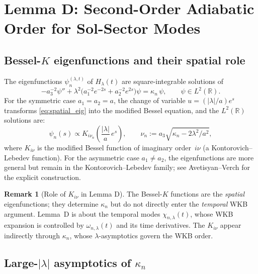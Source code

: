\documentclass[11pt,a4paper]{article}
\theoremstyle{definition}
\newtheorem{remark}[theorem]{Remark}
\newcommand{\R}{\mathbb{R}}
\newcommand{\Lp}{L^2}
\begin{document}
\section{Lemma D: Second-Order Adiabatic Order for Sol-Sector Modes}
\label{sec:lemmaD}

\subsection{Bessel-$K$ eigenfunctions and their spatial role}

The eigenfunctions $\psi_n^{(\lambda,t)}$ of $H_\lambda(t)$ are square-integrable
solutions of
\begin{equation}\label{eq:spatial_eig}
  -a_3^{-2}\psi'' + \lambda^2\bigl(a_1^{-2}e^{-2s} + a_2^{-2}e^{2s}\bigr)\psi
  = \kappa_n\,\psi, \qquad \psi \in \Lp(\R).
\end{equation}
For the symmetric case $a_1 = a_2 = a$, the change of variable $u = (|\lambda|/a)e^s$
transforms \eqref{eq:spatial_eig} into the modified Bessel equation, and the
$\Lp(\R)$ solutions are:
\begin{equation}\label{eq:Btype}
  \psi_n(s) \propto K_{i\nu_n}\!\left(\frac{|\lambda|}{a}\,e^s\right), \qquad
  \nu_n := a_3\sqrt{\kappa_n - 2\lambda^2/a^2},
\end{equation}
where $K_{i\nu}$ is the modified Bessel function of imaginary order~$i\nu$
(a Kontorovich--Lebedev function).  For the asymmetric case $a_1 \neq a_2$,
the eigenfunctions are more general but remain in the Kontorovich--Lebedev family;
see Avetisyan--Verch \cite{AV13} for the explicit construction.

\begin{remark}[Role of $K_{i\nu}$ in Lemma D]
The Bessel-$K$ functions are the \emph{spatial} eigenfunctions; they determine
$\kappa_n$ but do not directly enter the \emph{temporal} WKB argument.
Lemma~D is about the temporal modes $\chi_{n,\lambda}(t)$, whose
WKB expansion is controlled by $\omega_{n,\lambda}(t)$ and its time derivatives.
The $K_{i\nu}$ appear indirectly through $\kappa_n$, whose $\lambda$-asymptotics
govern the WKB order.
\end{remark}

\subsection{Large-$|\lambda|$ asymptotics of $\kappa_n$}
\end{document}
